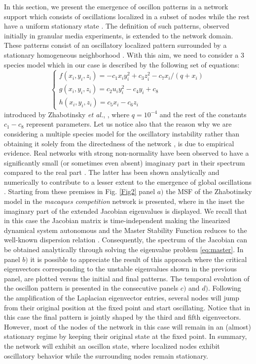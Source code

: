 \documentclass[prx,twocolumn,amsmath,noshowkeys,noshowpacs,amssymb]{revtex4-2}
\begin{document}
In this section, we present the emergence of oscillon patterns in a network support which consists of oscillations localized in a subset of nodes while the rest have a uniform stationary state \cite{Vanag_Epstein, oscillon_net}. The definition of such patterns, observed initially in granular media experiments, is extended to the network domain. These patterns consist of an oscillatory localized pattern surrounded by a stationary homogeneous neighborhood \cite{umbanhowar_localized_1996}. With this aim, we need to consider a 3 species model which in our case is described by the following set of equations:  
\begin{equation}
\begin{cases}
f(x_i,y_i,z_i)=-c_1x_iy_i^2  + c_3z_i^2 - c_7x_i/(q+x_i)\\
g(x_i,y_i,z_i)=c_2u_iy_i^2 - c_4y_i + c_8\\
h(x_i,y_i,z_i)=c_5x_i - c_6z_i
\end{cases}
\label{eq:Zhab}
\end{equation} 
introduced by Zhabotinsky \textit{et al.}, \cite{zhab, asllani_linear_2013}, where $q=10^{-4}$ and the rest of the constants $c_1-c_8$ represent parameters. Let us notice also that the reason why we are considering a multiple species model for the oscillatory instability rather than obtaining it solely from the directedness of the network \cite{asllani_theory_2014}, is due to empirical evidence. Real networks with strong non-normality have been observed to have a significantly small (or sometimes even absent) imaginary part in their spectrum compared to the real part \cite{asllani2018structure}. The latter has been shown analytically and numerically to contribute to a lesser extent to the emergence of global oscillations \cite{asllani_theory_2014, Asllani2018PRE, Muolo2021}. Starting from these premises in Fig. \ref{Fig2} panel $a)$ the MSF of the Zhabotinsky model in the \emph{macaques competition} network \cite{ref41} is presented, where in the inset the imaginary part of the extended Jacobian eigenvalues is displayed. We recall that in this case {the Jacobian matrix is time-independent} making the linearized dynamical system autonomous and the Master Stability Function reduces to the well-known dispersion relation \cite{Murray2008}. Consequently, the spectrum of the Jacobian can be obtained analytically through solving the eigenvalue problem \eqref{eq:master}. In panel $b)$ it is possible to appreciate the result of this approach where the critical eigenvectors corresponding to the unstable eigenvalues shown in the previous panel, are plotted versus the initial and final patterns. The temporal evolution of the oscillon pattern is presented in the consecutive panels $c)$ and $d)$. Following the amplification of the Laplacian eigenvector entries, several nodes will jump from their original position at the fixed point and start oscillating. {Notice that in this case the final pattern is jointly shaped by the third and fifth eigenvectors.} However, most of the nodes of the network in this case will remain in an (almost) stationary regime by keeping their original state at the fixed point. In summary, the network will exhibit an oscillon state, where localized nodes exhibit oscillatory behavior while the surrounding nodes remain stationary.
\end{document}
